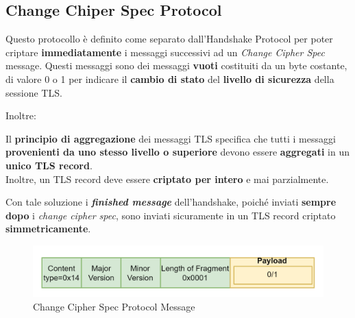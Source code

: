 \subsection{Change Chiper Spec Protocol}
\begin{definition}\label{def:changecipherprot}
Questo protocollo è definito come separato dall'Handshake Protocol per poter criptare \textbf{immediatamente} i messaggi successivi ad un \textit{Change Cipher Spec} message. Questi messaggi sono dei messaggi \textbf{vuoti} costituiti da un byte costante, di valore 0 o 1 per indicare il \textbf{cambio di stato} del \textbf{livello di sicurezza} della sessione TLS.
\end{definition} 
Inoltre:
\begin{theorem}
Il \textbf{principio di aggregazione} dei messaggi TLS specifica che tutti i messaggi \textbf{provenienti da uno stesso livello o superiore} devono essere \textbf{aggregati} in un \textbf{unico TLS record}.\\
Inoltre, un TLS record deve essere \textbf{criptato per intero} e mai parzialmente.
\end{theorem}
Con tale soluzione i \textbf{\textit{finished message}} dell'handshake, poiché inviati \textbf{sempre dopo} i \textit{change cipher spec}, sono inviati sicuramente in un TLS record criptato \textbf{simmetricamente}.
\begin{figure}[h]
    \centering
    \includegraphics{image/changecipher.png}
    \caption{Change Cipher Spec Protocol Message}
    \label{fig:changecipher}
\end{figure}
